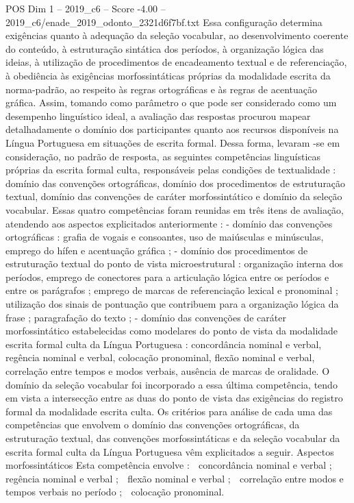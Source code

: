 \begin{textsample}{POS Dim 1 – 2019\_c6 – Score -4.00 – 2019\_c6/enade\_2019\_odonto\_2321d6f7bf.txt}
Essa configuração determina exigências quanto à adequação da seleção vocabular, ao desenvolvimento coerente do conteúdo, à estruturação sintática dos períodos, à organização lógica das ideias, à utilização de procedimentos de encadeamento textual e de referenciação, à obediência às exigências morfossintáticas próprias da modalidade escrita da norma-padrão, ao respeito às regras ortográficas e às regras de acentuação gráfica.
Assim, tomando como parâmetro o que pode ser considerado como um desempenho linguístico ideal, a avaliação das respostas procurou mapear detalhadamente o domínio dos participantes quanto aos recursos disponíveis na Língua Portuguesa em situações de escrita formal.
Dessa forma, levaram -se em consideração, no padrão de resposta, as seguintes competências linguísticas próprias da escrita formal culta, responsáveis pelas condições de textualidade : domínio das convenções ortográficas, domínio dos procedimentos de estruturação textual, domínio das convenções de caráter morfossintático e domínio da seleção vocabular.
Essas quatro competências foram reunidas em três itens de avaliação, atendendo aos aspectos explicitados anteriormente : - domínio das convenções ortográficas : grafia de vogais e consoantes, uso de maiúsculas e minúsculas, emprego do hífen e acentuação gráfica ; - domínio dos procedimentos de estruturação textual do ponto de vista microestrutural : organização interna dos períodos, emprego de conectores para a articulação lógica entre os períodos e entre os parágrafos ; emprego de marcas de referenciação lexical e pronominal ; utilização dos sinais de pontuação que contribuem para a organização lógica da frase ; paragrafação do texto ; - domínio das convenções de caráter morfossintático estabelecidas como modelares do ponto de vista da modalidade escrita formal culta da Língua Portuguesa : concordância nominal e verbal, regência nominal e verbal, colocação pronominal, flexão nominal e verbal, correlação entre tempos e modos verbais, ausência de marcas de oralidade.
O domínio da seleção vocabular foi incorporado a essa última competência, tendo em vista a intersecção entre as duas do ponto de vista das exigências do registro formal da modalidade escrita culta.
Os critérios para análise de cada uma das competências que envolvem o domínio das convenções ortográficas, da estruturação textual, das convenções morfossintáticas e da seleção vocabular da escrita formal culta da Língua Portuguesa vêm explicitados a seguir.
Aspectos morfossintáticos Esta competência envolve :  concordância nominal e verbal ;  regência nominal e verbal ;  flexão nominal e verbal ;  correlação entre modos e tempos verbais no período ;  colocação pronominal.

\end{textsample}
